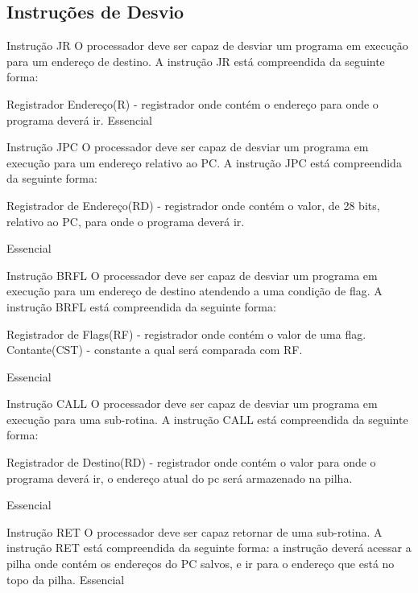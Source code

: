 \documentclass{article}
\begin{document}
    \subsection{Instruções de Desvio}

    \begin{functional}
      \requirement
      {Instrução JR}
      {O processador deve ser capaz de desviar um programa em execução para um endereço de destino.
      A instrução JR está compreendida da seguinte forma:}
       
         { Registrador Endereço(R) - registrador onde contém o endereço para onde o programa deverá ir.
      {Essencial}

      \requirement
      {Instrução JPC}
      {O processador deve ser capaz de desviar um programa em execução para um endereço relativo ao PC.
      A instrução JPC está compreendida da seguinte forma:}
       
         { Registrador de Endereço(RD) - registrador onde contém o valor, de 28 bits, relativo ao PC, para onde o programa deverá ir.}
         
      {Essencial}

      \requirement
      {Instrução BRFL}
      {O processador deve ser capaz de desviar um programa em execução para um endereço de destino atendendo a uma condição de flag.
      A instrução BRFL está compreendida da seguinte forma:}
       
         { Registrador de Flags(RF) - registrador onde contém o valor de uma flag.}
         { Contante(CST) - constante a qual será comparada com RF.}
         
      {Essencial}

      \requirement
      {Instrução CALL}
      {O processador deve ser capaz de desviar um programa em execução para uma sub-rotina.
      A instrução CALL está compreendida da seguinte forma:}
       
         \item Registrador de Destino(RD) - registrador onde contém o valor para onde o programa deverá ir, o endereço atual do pc será armazenado na pilha.}
        
      {Essencial}

      \requirement
      {Instrução RET}
      {O processador deve ser capaz retornar de uma sub-rotina.
      A instrução RET está compreendida da seguinte forma:}
      { a instrução deverá acessar a pilha onde contém os endereços do PC salvos, e ir para o endereço que está no topo da pilha.}
      {Essencial}



    \end{functional}
\end{document}
